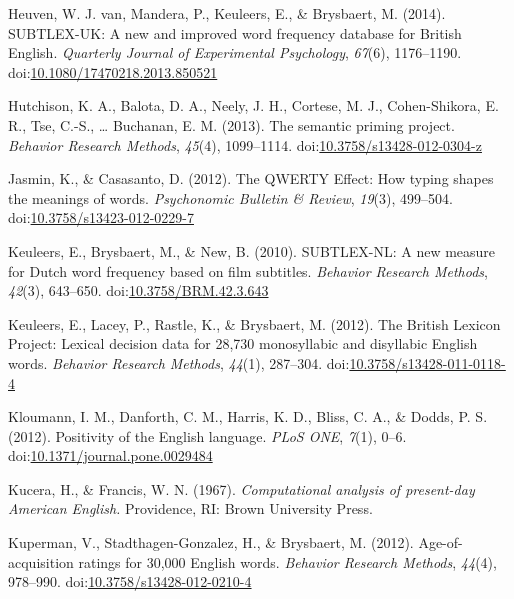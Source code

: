 \documentclass[english,man]{apa6}
\theoremstyle{definition}
\theoremstyle{definition}
\theoremstyle{definition}
\theoremstyle{remark}
\begin{document}
\hypertarget{ref-VanHeuven2014}{}
Heuven, W. J. van, Mandera, P., Keuleers, E., \& Brysbaert, M. (2014).
SUBTLEX-UK: A new and improved word frequency database for British
English. \emph{Quarterly Journal of Experimental Psychology},
\emph{67}(6), 1176--1190.
doi:\href{https://doi.org/10.1080/17470218.2013.850521}{10.1080/17470218.2013.850521}

\hypertarget{ref-Hutchison2013}{}
Hutchison, K. A., Balota, D. A., Neely, J. H., Cortese, M. J.,
Cohen-Shikora, E. R., Tse, C.-S., \ldots{} Buchanan, E. M. (2013). The
semantic priming project. \emph{Behavior Research Methods},
\emph{45}(4), 1099--1114.
doi:\href{https://doi.org/10.3758/s13428-012-0304-z}{10.3758/s13428-012-0304-z}

\hypertarget{ref-Jasmin2012}{}
Jasmin, K., \& Casasanto, D. (2012). The QWERTY Effect: How typing
shapes the meanings of words. \emph{Psychonomic Bulletin \& Review},
\emph{19}(3), 499--504.
doi:\href{https://doi.org/10.3758/s13423-012-0229-7}{10.3758/s13423-012-0229-7}

\hypertarget{ref-Keuleers2010}{}
Keuleers, E., Brysbaert, M., \& New, B. (2010). SUBTLEX-NL: A new
measure for Dutch word frequency based on film subtitles. \emph{Behavior
Research Methods}, \emph{42}(3), 643--650.
doi:\href{https://doi.org/10.3758/BRM.42.3.643}{10.3758/BRM.42.3.643}

\hypertarget{ref-Keuleers2012}{}
Keuleers, E., Lacey, P., Rastle, K., \& Brysbaert, M. (2012). The
British Lexicon Project: Lexical decision data for 28,730 monosyllabic
and disyllabic English words. \emph{Behavior Research Methods},
\emph{44}(1), 287--304.
doi:\href{https://doi.org/10.3758/s13428-011-0118-4}{10.3758/s13428-011-0118-4}

\hypertarget{ref-Kloumann2012}{}
Kloumann, I. M., Danforth, C. M., Harris, K. D., Bliss, C. A., \& Dodds,
P. S. (2012). Positivity of the English language. \emph{PLoS ONE},
\emph{7}(1), 0--6.
doi:\href{https://doi.org/10.1371/journal.pone.0029484}{10.1371/journal.pone.0029484}

\hypertarget{ref-Kucera1967}{}
Kucera, H., \& Francis, W. N. (1967). \emph{Computational analysis of
present-day American English.} Providence, RI: Brown University Press.

\hypertarget{ref-Kuperman2012}{}
Kuperman, V., Stadthagen-Gonzalez, H., \& Brysbaert, M. (2012).
Age-of-acquisition ratings for 30,000 English words. \emph{Behavior
Research Methods}, \emph{44}(4), 978--990.
doi:\href{https://doi.org/10.3758/s13428-012-0210-4}{10.3758/s13428-012-0210-4}
\end{document}
